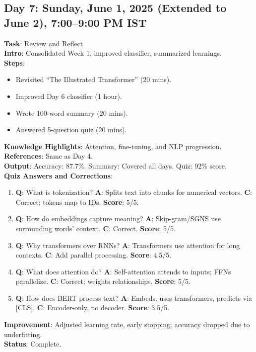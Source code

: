 \documentclass[a4paper,12pt]{article}
\begin{document}
\subsection*{Day 7: Sunday, June 1, 2025 (Extended to June 2), 7:00--9:00 PM IST}
\textbf{Task}: Review and Reflect \\
\textbf{Intro}: Consolidated Week 1, improved classifier, summarized learnings. \\
\textbf{Steps}:
\begin{itemize}
    \item Revisited ``The Illustrated Transformer'' (20 mins).
    \item Improved Day 6 classifier (1 hour).
    \item Wrote 100-word summary (20 mins).
    \item Answered 5-question quiz (20 mins).
\end{itemize}
\textbf{Knowledge Highlights}: Attention, fine-tuning, and NLP progression. \\
\textbf{References}: Same as Day 4. \\
\textbf{Output}: Accuracy: 87.7\%. Summary: Covered all days. Quiz: 92\% score. \\
\textbf{Quiz Answers and Corrections}:
\begin{enumerate}
    \item \textbf{Q}: What is tokenization? \textbf{A}: Splits text into chunks for numerical vectors. \textbf{C}: Correct; tokens map to IDs. \textbf{Score}: 5/5.
    \item \textbf{Q}: How do embeddings capture meaning? \textbf{A}: Skip-gram/SGNS use surrounding words’ context. \textbf{C}: Correct. \textbf{Score}: 5/5.
    \item \textbf{Q}: Why transformers over RNNs? \textbf{A}: Transformers use attention for long contexts. \textbf{C}: Add parallel processing. \textbf{Score}: 4.5/5.
    \item \textbf{Q}: What does attention do? \textbf{A}: Self-attention attends to inputs; FFNs parallelize. \textbf{C}: Correct; weights relationships. \textbf{Score}: 5/5.
    \item \textbf{Q}: How does BERT process text? \textbf{A}: Embeds, uses transformers, predicts via [CLS]. \textbf{C}: Encoder-only, no decoder. \textbf{Score}: 3.5/5.
\end{enumerate}
\textbf{Improvement}: Adjusted learning rate, early stopping; accuracy dropped due to underfitting. \\
\textbf{Status}: Complete.

\end{document}
